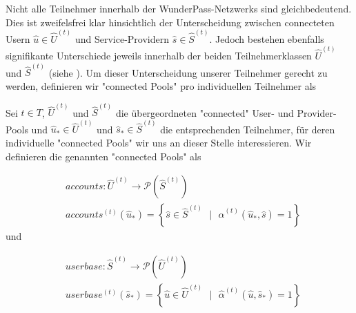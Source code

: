 \vspace{1cm}



\vspace{0.3cm}

Nicht alle Teilnehmer innerhalb der WunderPass-Netzwerks sind gleichbedeutend. Dies ist zweifelsfrei klar hinsichtlich der Unterscheidung zwischen connecteten Usern $\widehat{u} \in \widehat{U}^{(t)}$ und Service-Providern $\widehat{s} \in \widehat{S}^{(t)}$. Jedoch bestehen ebenfalls signifikante Unterschiede jeweils innerhalb der beiden Teilnehmerklassen $\widehat{U}^{(t)}$ und $\widehat{S}^{(t)}$ (siehe \todo{[TODO4]["Sättigung"]}). Um dieser Unterscheidung unserer Teilnehmer gerecht zu werden, definieren wir "connected Pools" pro individuellen Teilnehmer als

\vspace{0.3cm}

\begin{Def}\label{defTeilnehmerPool}

Sei $t \in T$, $\widehat{U}^{(t)}$ und $\widehat{S}^{(t)}$ die übergeordneten "connected" User- und Provider-Pools und $\widehat{u}_{*} \in \widehat{U}^{(t)}$ und $\widehat{s}_{*} \in \widehat{S}^{(t)}$ die entsprechenden Teilnehmer, für deren individuelle "connected Pools" wir uns an dieser Stelle interessieren. Wir definieren die genannten "connected Pools" als

\begin{align*}
&accounts : \widehat{U}^{(t)} \rightarrow \mathcal{P}\left(\widehat{S}^{(t)}\right) \\
&accounts^{(t)}(\widehat{u}_{*}) = \left\{\widehat{s} \in \widehat{S}^{(t)} \textrm{ } | \textrm{ } \widehat{\alpha}^{(t)}(\widehat{u}_{*}, \widehat{s}) = 1 \right\}
\end{align*}
und

\begin{align*}
&userbase : \widehat{S}^{(t)} \rightarrow \mathcal{P}\left(\widehat{U}^{(t)}\right) \\
&userbase^{(t)}(\widehat{s}_{*}) = \left\{\widehat{u} \in \widehat{U}^{(t)} \textrm{ } | \textrm{ } \widehat{\alpha}^{(t)}(\widehat{u}, \widehat{s}_{*}) = 1 \right\}
\end{align*}

\end{Def}

\vspace{0.6cm}

